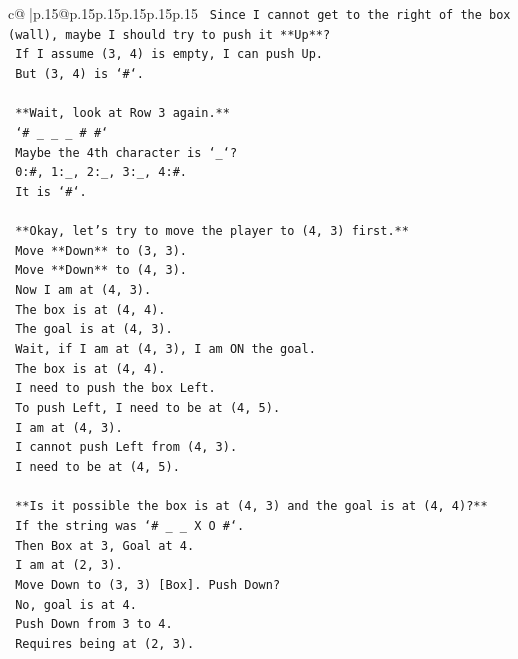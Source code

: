 \documentclass{article}
\begin{document}
{\begin{supertabular}{c@{$\;$}|p{.15\linewidth}@{}p{.15\linewidth}p{.15\linewidth}p{.15\linewidth}p{.15\linewidth}p{.15\linewidth}}
{{{\texttt{    Since I cannot get to the right of the box (wall), maybe I should try to push it **Up**?} \\
\texttt{    If I assume (3, 4) is empty, I can push Up.} \\
\texttt{    But (3, 4) is `\#`.} \\
\\ 
\texttt{    **Wait, look at Row 3 again.**} \\
\texttt{    `\# \_ \_ \_ \# \#`} \\
\texttt{    Maybe the 4th character is `\_`?} \\
\texttt{    0:\#, 1:\_, 2:\_, 3:\_, 4:\#.} \\
\texttt{    It is `\#`.} \\
\\ 
\texttt{    **Okay, let's try to move the player to (4, 3) first.**} \\
\texttt{    Move **Down** to (3, 3).} \\
\texttt{    Move **Down** to (4, 3).} \\
\texttt{    Now I am at (4, 3).} \\
\texttt{    The box is at (4, 4).} \\
\texttt{    The goal is at (4, 3).} \\
\texttt{    Wait, if I am at (4, 3), I am ON the goal.} \\
\texttt{    The box is at (4, 4).} \\
\texttt{    I need to push the box Left.} \\
\texttt{    To push Left, I need to be at (4, 5).} \\
\texttt{    I am at (4, 3).} \\
\texttt{    I cannot push Left from (4, 3).} \\
\texttt{    I need to be at (4, 5).} \\
\\ 
\texttt{    **Is it possible the box is at (4, 3) and the goal is at (4, 4)?**} \\
\texttt{    If the string was `\# \_ \_ X O \#`.} \\
\texttt{    Then Box at 3, Goal at 4.} \\
\texttt{    I am at (2, 3).} \\
\texttt{    Move Down to (3, 3) {[}Box{]}. Push Down?} \\
\texttt{    No, goal is at 4.} \\
\texttt{    Push Down from 3 to 4.} \\
\texttt{    Requires being at (2, 3).} \\
}}}
\end{supertabular}}
\end{document}
